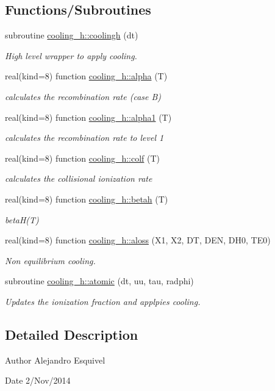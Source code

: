 \subsection*{Functions/\+Subroutines}
\begin{DoxyCompactItemize}
\item 
subroutine \hyperlink{namespacecooling__h_ad092ffe4588667ec0c7360154f3ca7ff}{cooling\+\_\+h\+::coolingh} (dt)
\begin{DoxyCompactList}\small\item\em High level wrapper to apply cooling. \end{DoxyCompactList}\item 
real(kind=8) function \hyperlink{namespacecooling__h_a09de30645cebf531a647b5f53ae143b2}{cooling\+\_\+h\+::alpha} (T)
\begin{DoxyCompactList}\small\item\em calculates the recombination rate (case B) \end{DoxyCompactList}\item 
real(kind=8) function \hyperlink{namespacecooling__h_a5454f21ef468add797c58753a1e0c773}{cooling\+\_\+h\+::alpha1} (T)
\begin{DoxyCompactList}\small\item\em calculates the recombination rate to level 1 \end{DoxyCompactList}\item 
real(kind=8) function \hyperlink{namespacecooling__h_ad5f1352f8925ccb1b352d6e749465a92}{cooling\+\_\+h\+::colf} (T)
\begin{DoxyCompactList}\small\item\em calculates the collisional ionization rate \end{DoxyCompactList}\item 
real(kind=8) function \hyperlink{namespacecooling__h_a2a2de25572bd515eae9441391e0ed0f8}{cooling\+\_\+h\+::betah} (T)
\begin{DoxyCompactList}\small\item\em beta\+H(\+T) \end{DoxyCompactList}\item 
real(kind=8) function \hyperlink{namespacecooling__h_a92cfd14c9b02e853eb33d22857fabeed}{cooling\+\_\+h\+::aloss} (X1, X2, D\+T, D\+E\+N, D\+H0, T\+E0)
\begin{DoxyCompactList}\small\item\em Non equilibrium cooling. \end{DoxyCompactList}\item 
subroutine \hyperlink{namespacecooling__h_aef95dbca5e7aef78d66a225cc217c982}{cooling\+\_\+h\+::atomic} (dt, uu, tau, radphi)
\begin{DoxyCompactList}\small\item\em Updates the ionization fraction and applpies cooling. \end{DoxyCompactList}\end{DoxyCompactItemize}


\subsection{Detailed Description}
\begin{DoxyAuthor}{Author}
Alejandro Esquivel 
\end{DoxyAuthor}
\begin{DoxyDate}{Date}
2/\+Nov/2014 
\end{DoxyDate}

